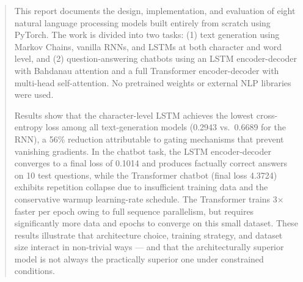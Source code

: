 \maketitle
\begin{abstract}
This report documents the design, implementation, and evaluation of eight natural
language processing models built entirely from scratch using PyTorch. The work is
divided into two tasks: (1) text generation using Markov Chains, vanilla RNNs,
and LSTMs at both character and word level, and (2) question-answering chatbots
using an LSTM encoder-decoder with Bahdanau attention and a full Transformer
encoder-decoder with multi-head self-attention. No pretrained weights or external
NLP libraries were used.

Results show that the character-level LSTM achieves the lowest cross-entropy loss
among all text-generation models (0.2943 vs.\ 0.6689 for the RNN), a 56\%
reduction attributable to gating mechanisms that prevent vanishing gradients.
In the chatbot task, the LSTM encoder-decoder converges to a final loss of 0.1014
and produces factually correct answers on 10 test questions, while the Transformer
chatbot (final loss 4.3724) exhibits repetition collapse due to insufficient
training data and the conservative warmup learning-rate schedule. The Transformer
trains 3× faster per epoch owing to full sequence parallelism, but requires
significantly more data and epochs to converge on this small dataset. These results
illustrate that architecture choice, training strategy, and dataset size interact
in non-trivial ways — and that the architecturally superior model is not always
the practically superior one under constrained conditions.
\end{abstract}

\clearpage
